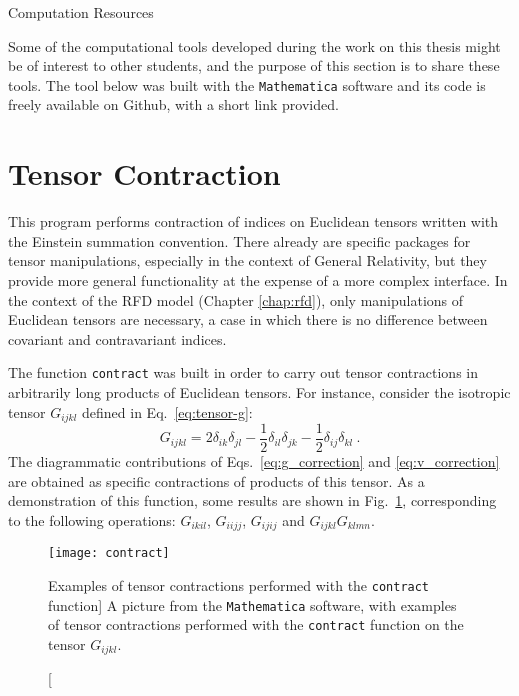 \begin{chapter}{Computation Resources}
\label{app:comp}

\hspace{5 mm} 

Some of the computational tools developed during the work on this thesis might be of interest to other students, and the purpose of this section is to share these tools.
The tool below was built with the \texttt{Mathematica} software and its code is freely available on Github, with a short link provided.

\section{Tensor Contraction}

This program performs contraction of indices on Euclidean
tensors written with the Einstein summation convention.
There already are specific packages for tensor manipulations,
especially in the context of General Relativity, but they provide
more general functionality at the expense of a more complex
interface.
In the context of the RFD model (Chapter \ref{chap:rfd}), only manipulations of Euclidean tensors are necessary, a case in which there is no difference between covariant and contravariant indices.

The function \texttt{contract} was built in order to carry out tensor contractions in arbitrarily long products of Euclidean tensors. 
For instance, consider the isotropic tensor $G_{ijkl}$ defined in Eq.~\eqref{eq:tensor-g}:
\begin{equation}
G_{ijkl} = 2 \delta_{ik} \delta_{jl} - \frac12 \delta_{il} \delta_{jk} - \frac12 \delta_{ij} \delta_{kl} \ .
\end{equation}
The diagrammatic contributions of Eqs.~\eqref{eq:g_correction} and \eqref{eq:v_correction} are obtained as specific contractions of products of this tensor. 
As a demonstration of this function, some results are shown in Fig.~\ref{fig:contract}, corresponding to the following operations: $G_{ikil}$, $G_{iijj}$, $G_{ijij}$ and $G_{ijkl}G_{klmn}$.

\begin{figure}[h]
	\centering
	\texttt{[image: contract]}
	\caption
	[Examples of tensor contractions performed with the \texttt{contract} function]
	{A picture from the \texttt{Mathematica} software, with 
	examples of tensor contractions performed with the \texttt{contract} function on the tensor $G_{ijkl}$.}
	\label{fig:contract}
\end{figure}


\end{chapter}
